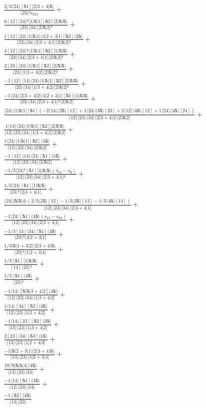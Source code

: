 \documentclass[varwidth, border=5pt]{standalone}
\begin{document}
\begin{my}
$\begin{gathered}
\scriptscriptstyle\frac{2/3⟨24⟩[𝟓1][2|3+4|𝟓⟩}{⟨23⟩²s_{234}} +\\
\scriptscriptstyle\frac{6[12]⟨24⟩²⟨1|𝟓|1][𝟓2][2|𝟓|𝟓⟩}{⟨23⟩⟨34⟩⟨2|𝟓|2]³} +\\
\scriptscriptstyle\frac{1[12]⟨24⟩⟨1|𝟓|1]⟨4|2+3|1][𝟓2]⟨2𝟓⟩}{⟨23⟩⟨34⟩⟨2|3+4|1]⟨2|𝟓|2]²} +\\
\scriptscriptstyle\frac{4[12]⟨24⟩²⟨1|𝟓|1][𝟓2][1|𝟓|𝟓⟩}{⟨23⟩⟨34⟩⟨2|3+4|1]⟨2|𝟓|2]²} +\\
\scriptscriptstyle\frac{2[23]⟨24⟩⟨1|𝟓|1][𝟓2][2|𝟓|𝟓⟩}{⟨23⟩⟨1|3+4|2]⟨2|𝟓|2]²} +\\
\scriptscriptstyle\frac{-1[12]⟨14⟩⟨24⟩⟨1|𝟓|1][𝟓2][2|𝟓|𝟓⟩}{⟨23⟩⟨34⟩⟨1|3+4|2]⟨2|𝟓|2]²} +\\
\scriptscriptstyle\frac{-1⟨24⟩⟨2|3+4|2]⟨4|2+3|1][𝟓1][1|𝟓|𝟓⟩}{⟨23⟩⟨34⟩⟨2|3+4|1]²⟨2|𝟓|2]} +\\
\scriptscriptstyle\frac{⟨24⟩⟨1|𝟓|1][𝟓1](-2⟨14⟩⟨2𝟓⟩[12]+1⟨24⟩⟨3𝟓⟩[23]+2⟨12⟩⟨4𝟓⟩[12]+1⟨24⟩⟨4𝟓⟩[24])}{⟨12⟩⟨23⟩⟨34⟩⟨2|3+4|1]⟨2|𝟓|2]} +\\
\scriptscriptstyle\frac{1⟨14⟩⟨24⟩⟨1|𝟓|1][𝟓2][2|𝟓|𝟓⟩}{⟨12⟩⟨23⟩⟨34⟩⟨1|3+4|2]⟨2|𝟓|2]} +\\
\scriptscriptstyle\frac{1⟨24⟩⟨1|𝟓|1][𝟓2]⟨4𝟓⟩}{⟨12⟩⟨23⟩⟨34⟩⟨2|𝟓|2]} +\\
\scriptscriptstyle\frac{-1[12]⟨14⟩⟨24⟩[𝟓1]⟨1𝟓⟩}{⟨12⟩⟨23⟩⟨34⟩⟨2|𝟓|2]} +\\
\scriptscriptstyle\frac{-1/3⟨24⟩²[𝟓1][1|𝟓|𝟓⟩(s_{12}-s_{𝟓})}{⟨12⟩⟨23⟩⟨34⟩⟨2|3+4|1]²} +\\
\scriptscriptstyle\frac{1/3⟨24⟩[𝟓1][1|𝟓|𝟓⟩}{⟨23⟩²⟨2|3+4|1]} +\\
\scriptscriptstyle\frac{⟨24⟩[𝟓|𝟓|4⟩(2/3⟨2𝟓⟩[12]-1/3⟨3𝟓⟩[13]-1/3⟨4𝟓⟩[14])}{⟨12⟩⟨23⟩⟨34⟩⟨2|3+4|1]} +\\
\scriptscriptstyle\frac{-1⟨24⟩[𝟓1]⟨4𝟓⟩(s_{12}-s_{34})}{⟨12⟩⟨23⟩⟨34⟩⟨2|3+4|1]} +\\
\scriptscriptstyle\frac{-1/3[13]⟨34⟩[𝟓1]⟨4𝟓⟩}{⟨23⟩²⟨4|2+3|1]} +\\
\scriptscriptstyle\frac{1/3[𝟓|1+3|2⟩[2|3+4|𝟓⟩}{⟨23⟩²⟨1|2+3|4]} +\\
\scriptscriptstyle\frac{1/3[𝟓1][1|𝟓|𝟓⟩}{[14]⟨23⟩²} +\\
\scriptscriptstyle\frac{1/3[𝟓1]⟨4𝟓⟩}{⟨23⟩²} +\\
\scriptscriptstyle\frac{-1⟨14⟩[𝟓|𝟓|3+4|2]⟨4𝟓⟩}{⟨12⟩⟨23⟩⟨34⟩⟨1|3+4|2]} +\\
\scriptscriptstyle\frac{1⟨14⟩[34][𝟓2]⟨4𝟓⟩}{⟨12⟩⟨23⟩⟨1|3+4|2]} +\\
\scriptscriptstyle\frac{-1⟨14⟩[23][𝟓2]⟨3𝟓⟩}{⟨13⟩⟨23⟩⟨1|3+4|2]} +\\
\scriptscriptstyle\frac{2[23]⟨34⟩[𝟓3]⟨1𝟓⟩}{⟨13⟩⟨23⟩⟨1|2+4|3]} +\\
\scriptscriptstyle\frac{-1[𝟓|2+3|1⟩[2|3+4|𝟓⟩}{⟨13⟩⟨23⟩⟨1|2+3|4]} +\\
\scriptscriptstyle\frac{10/9[𝟓|𝟓|4⟩⟨4𝟓⟩}{⟨12⟩⟨23⟩⟨34⟩} +\\
\scriptscriptstyle\frac{-1⟨14⟩[𝟓1]⟨4𝟓⟩}{⟨12⟩⟨23⟩⟨34⟩} +\\
\scriptscriptstyle\frac{-1[𝟓2]⟨4𝟓⟩}{⟨13⟩⟨23⟩} \phantom{+}
\end{gathered}$
\end{my}
\end{document}
